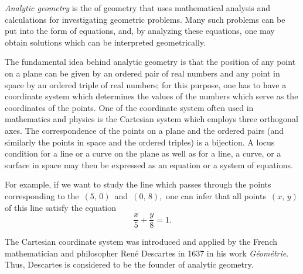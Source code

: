 \documentclass[12pt]{article}
\theoremstyle{definition}
\begin{document}
\emph{Analytic geometry} is the  of geometry that uses mathematical analysis and  calculations for investigating geometric problems.  Many such problems can be put into the form of equations, and, by analyzing these equations, one may obtain solutions which can be interpreted geometrically.  

The fundamental idea behind analytic geometry is that the position of any point on a plane can be given by an ordered pair of real numbers and any point in space by an ordered triple of real numbers; for this purpose, one has to have a coordinate system which determines the values of the numbers which serve as the coordinates of the points.  
One of the coordinate system often used in mathematics and physics is the Cartesian system which employs three orthogonal axes. The correspondence of the points on a plane and the ordered pairs (and similarly the points in space and the ordered triples) is a bijection.  A locus condition for a line or a curve on the plane as well as for a line, a curve, or a surface in space may then be expressed as an equation or a system of equations.

For example, if we want to study the line which passes through the points corresponding to the 
 \,$(5,\,0)$\, and\, $(0,\,8)$,\, one can infer that all points\, $(x,\,y)$\, of this line satisfy the equation
                       $$\frac{x}{5}+\frac{y}{8} = 1.$$

The Cartesian coordinate system was introduced and applied by the French mathematician and philosopher Ren\'e Descartes in 1637 in his work {\em G\'eom\'etrie}.  Thus, Descartes is considered to be the founder of analytic geometry.
\end{document}

